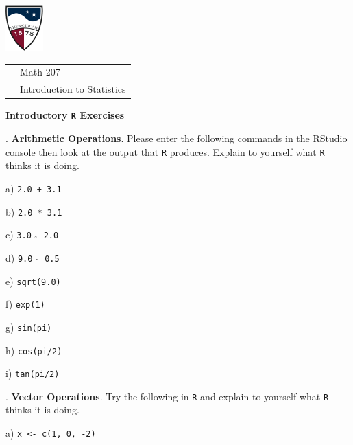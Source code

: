 \documentclass[10pt]{article}
\newcounter{EX}\setcounter{EX}{1}
\newcommand{\EXERCISE}{\arabic{EX}.\stepcounter{EX} }
\begin{document}
\pagestyle{empty}
\lstset{language=R, showspaces=false, showstringspaces=false}

\href{http://www.su.edu}{\includegraphics[height=1.75cm]{sulogo.eps}}
\vspace{-1.69cm}

{\small \hfill
\begin{tabular}{cl}
& Math 207\\& Introduction to Statistics\\
\end{tabular}
}
\setlength{\baselineskip}{1.05\baselineskip}
\medskip

\begin{center}
\textbf{\large  Introductory \texttt{R} Exercises}
\end{center}

\newcommand{\SUBX}{\smallskip\hspace{10pt}}
\newcommand{\BSK}{\vspace{.14in}}

\EXERCISE \textbf{Arithmetic Operations}.
Please enter the following commands in the RStudio console then look at the output
that \texttt{R} produces. Explain to yourself what \texttt{R} thinks it is doing.

\SUBX a) \texttt{2.0 + 3.1}
\BSK

\SUBX b) \texttt{2.0 * 3.1}
\BSK

\SUBX c) \texttt{3.0 $\widehat{\hspace{3pt}}$ 2.0}
\BSK

\SUBX d) \texttt{9.0  $\widehat{\hspace{3pt}}$  0.5}
\BSK

\SUBX e) \texttt{sqrt(9.0)}
\BSK

\SUBX f) \texttt{exp(1)}
\BSK

\SUBX g) \texttt{sin(pi)}
\BSK

\SUBX h) \texttt{cos(pi/2)}
\BSK

\SUBX i) \texttt{tan(pi/2)}
\BSK

\EXERCISE \textbf{Vector Operations}.
Try the following in \texttt{R} and explain to yourself
what \texttt{R} thinks it is doing.
\vspace{-5pt}

\SUBX a) \texttt{x <- c(1, 0, -2)}
\BSK
\end{document}
